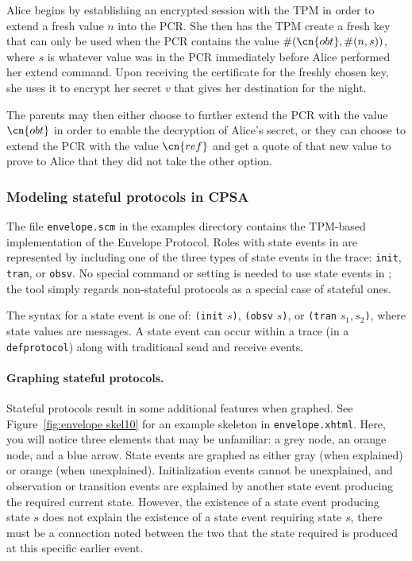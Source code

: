 Alice begins by establishing an encrypted session with the TPM in
order to extend a fresh value $n$ into the PCR. She then has the TPM
create a fresh key that can only be used when the PCR contains the
value $\#(\cn{obt},\#(n,s))$, where $s$ is whatever value was in the
PCR immediately before Alice performed her extend command. Upon
receiving the certificate for the freshly chosen key, she uses it to
encrypt her secret $v$ that gives her destination for the night.

The parents may then either choose to further extend the PCR with the
value $\cn{obt}$ in order to enable the decryption of Alice's secret,
or they can choose to extend the PCR with the value $\cn{ref}$ and get
a quote of that new value to prove to Alice that they did not take the
other option.

\subsubsection{Modeling stateful protocols in CPSA}

 The file \texttt{envelope.scm} in the examples directory
contains the TPM-based implementation of the Envelope Protocol.  Roles
with state events in {\cpsa} are represented by including one of the
three types of state events in the trace: \texttt{init},
\texttt{tran}, or \texttt{obsv}.  No special command or setting is
needed to use state events in {\cpsa}; the tool simply regards
non-stateful protocols as a special case of stateful ones.

  
The syntax for a state event is one of: \texttt{(init} $s$\texttt{)},
\texttt{(obsv} $s$\texttt{)}, or \texttt{(tran} $s_1, s_2$\texttt{)},
where state values are messages.  A state event can occur within a
trace (in a \texttt{defprotocol}) along with traditional send and
receive events.

\paragraph{Graphing stateful protocols.}
Stateful protocols result in some additional features when graphed.
See Figure~\ref{fig:envelope skel10} for an example skeleton in
\texttt{envelope.xhtml}.  Here, you will notice three elements that may be
unfamiliar: a grey node, an orange node, and a blue arrow.  State
events are graphed as either gray (when explained) or orange (when
unexplained).  Initialization events cannot be unexplained, and
observation or transition events are explained by another state event
producing the required current state.  However, the existence of a
state event producing state $s$ does not explain the existence of a
state event requiring state $s$, there must be a connection noted
between the two that the state required is produced at this specific
earlier event.


